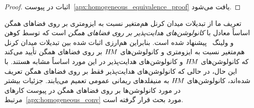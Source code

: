 \begin{proof}
    اثبات در پیوست~\ref{apx:homogeneous_equivalence_proof} یافت می‌شود.
\end{proof}
تعریف ما از تبدیلات میدان کرنل هم‌متغیر نسبت به ایزومتری بر روی فضاهای همگن اساساً معادل با \emph{کانولوشن‌های هدایت‌پذیر بر روی فضاهای همگن} است که توسط کوهن و ولینگ~\cite{Cohen2018-intertwiners,Cohen2019-generaltheory} پیشنهاد شده است.
بنابراین هم‌ارزی اثبات شده بین تبدیلات میدان کرنل هم‌متغیر نسبت به ایزومتری و کانولوشن‌های $H\mkern-2.5muM$ بر روی فضاهای همگن تأیید می‌کند که کانولوشن‌های $H\mkern-2.5muM$ و کانولوشن‌های هدایت‌پذیر در این مورد اساساً مشابه هستند.
با این حال، در حالی که کانولوشن‌های هدایت‌پذیر فقط بر روی فضاهای همگن تعریف شده‌اند، کانولوشن‌های $H\mkern-2.5muM$ به منیفلدهای ریمانی عمومی تعمیم می‌یابند.
جزئیات بیشتر در مورد کانولوشن‌ها بر روی فضاهای همگن در پیوست کارهای مرتبط~\ref{apx:homogeneous_conv} مورد بحث قرار گرفته است.